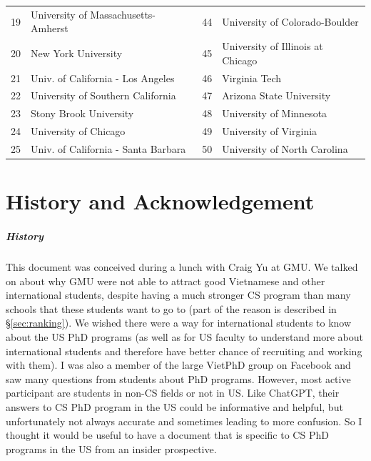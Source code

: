 \documentclass[oneside,11pt]{memoir}
\newcommand{\red}[1]{{\color{red}{#1}}}
\begin{document}
\begin{table}
\begin{tabular}{rl|rl}
    19 & University of Massachusetts-Amherst\red{$^*$} & 44&  University of Colorado-Boulder \\
    20 &  New York University  &45& University of Illinois at Chicago  \\
    21 & Univ. of California - Los Angeles &46& Virginia Tech\red{$^*$}  \\
    22 & University of Southern California &47&  Arizona State University\red{$^*$} \\
    23 & Stony Brook University\red{$^*$} &48&University of Minnesota \\
    24 & University of Chicago &49& University of Virginia \\
    25 & Univ. of California - Santa Barbara &50& University of North Carolina\red{$^*$} \\
    \bottomrule
    \end{tabular}
\end{table}



\chapter{History and Acknowledgement}

\paragraph{History} This document was conceived during a lunch with Craig Yu at GMU.  We talked on about why GMU were not able to attract good Vietnamese and other international students, despite having a much stronger CS program than many schools that these students want to go to (part of the reason is described in \S\ref{sec:ranking}). We wished there were a way for international students to know about the US PhD programs (as well as for US faculty to understand more about international students and therefore have better chance of recruiting and working with them). I was also  a member of the large VietPhD group on Facebook and saw many questions from students about PhD programs.  However, most active participant are students in non-CS fields or not in US. Like ChatGPT, their answers to CS PhD program in the US could be informative and helpful, but unfortunately not always accurate and sometimes leading to more confusion. So I thought it would be useful to have a document that is specific to CS PhD programs in the US from an insider prospective.  
\end{document}

